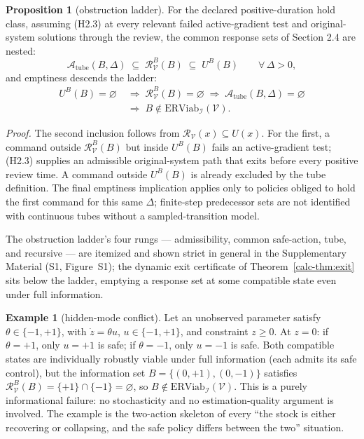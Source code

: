 \documentclass[10pt,twocolumn]{article}
\theoremstyle{definition}
\newtheorem{proposition}{Proposition}
\newtheorem{example}{Example}
\begin{document}
\begin{proposition}[obstruction ladder]\label{calc-prop:ladder}
For the declared positive-duration hold class, assuming (H2.3) at every relevant failed active-gradient test and original-system solutions through the review, the common response sets
of Section 2.4 are nested:
\[\mathcal{A}_{\mathrm{tube}}(B,\Delta) \;\subseteq\; \mathcal{R}_{\mathcal{V}}^B(B) \;\subseteq\; U^B(B) \qquad \forall\,\Delta>0,\]
and emptiness descends the ladder:
\[
\begin{aligned}
U^B(B)=\varnothing \;&\Longrightarrow\; \mathcal{R}_{\mathcal{V}}^B(B)=\varnothing \;\Longrightarrow\; \mathcal{A}_{\mathrm{tube}}(B,\Delta)=\varnothing \\
&\Longrightarrow\; B\notin\mathrm{ERViab}_{\mathcal{I}}(\mathcal{V}).
\end{aligned}
\]
\end{proposition}

\emph{Proof.} The second inclusion follows from \(\mathcal R_{\mathcal V}(x)\subseteq U(x)\). For the first, a command outside \(\mathcal R_{\mathcal V}^B(B)\) but inside \(U^B(B)\) fails an active-gradient test; (H2.3) supplies an admissible original-system path that exits before every positive review time. A command outside \(U^B(B)\) is already excluded by the tube definition. The final emptiness implication applies only to policies obliged to hold the first command for this same \(\Delta\); finite-step predecessor sets are not identified with continuous tubes without a sampled-transition model.

The obstruction ladder's four rungs --- admissibility, common safe-action, tube, and recursive --- are itemized and shown strict in general in the Supplementary Material (S1, Figure~S1); the dynamic exit certificate of Theorem~\ref{calc-thm:exit} sits below the ladder, emptying a response set at some compatible state even under full information.

\begin{example}[hidden-mode conflict]\label{calc-ex:hidden-mode} Let an unobserved parameter satisfy
\(\theta \in \{-1, +1\}\), with \(\dot z = \theta u\),
\(u \in \{-1, +1\}\), and constraint \(z \ge 0\). At \(z = 0\): if
\(\theta = +1\), only \(u = +1\) is safe; if \(\theta = -1\), only
\(u = -1\) is safe. Both compatible states are individually robustly
viable under full information (each admits its safe control), but the
information set \(B = \{(0, +1), (0, -1)\}\) satisfies
\(\mathcal{R}_{\mathcal{V}}^B(B) = \{+1\} \cap \{-1\} = \varnothing\),
so \(B \notin \mathrm{ERViab}_{\mathcal{I}}(\mathcal{V})\). This is a
purely informational failure: no stochasticity and no estimation-quality
argument is involved. The example is the two-action skeleton of every
``the stock is either recovering or collapsing, and the safe policy
differs between the two'' situation.

\end{example}
\end{document}

